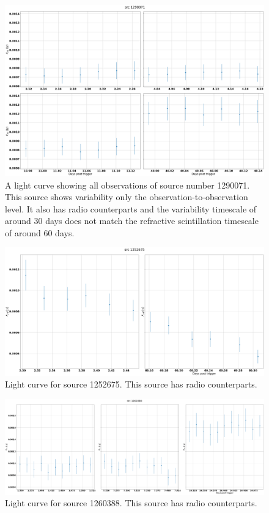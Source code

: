 \documentclass[12pt]{article}
\begin{document}
\begin{figure}
	\includegraphics[width=\textwidth]{src1290071multi.png}
	\caption{A light curve showing all observations of source number 1290071. This source shows variability only the observation-to-observation level. It also has radio counterparts and the variability timescale of around 30 days does not match the refractive scintillation timescale of around 60 days.}
	\label{fig:src1290071multi}
\end{figure}
\begin{figure}
	\includegraphics[width=\textwidth]{src1252675multi.png}
	\caption{Light curve for source 1252675. This source has radio counterparts.}
	\label{fig:src1252675multi}
\end{figure}
\begin{figure}
	\includegraphics[width=\textwidth]{src1260388multi.png}
	\caption{Light curve for source 1260388. This source has radio counterparts.}
	\label{fig:src1260388multi}
\end{figure}
\end{document}
